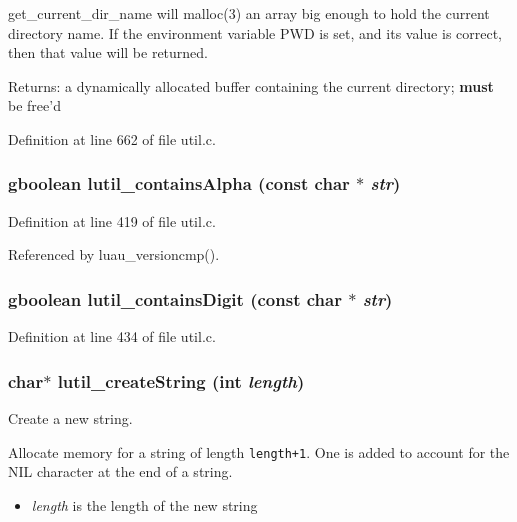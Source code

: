 get\_\-current\_\-dir\_\-name will malloc(3) an array big enough to hold the current directory name. If the environment variable PWD is set, and its value is correct, then that value will be returned.

\begin{Desc}
\item[Returns:]a dynamically allocated buffer containing the current directory; {\bf must} be free'd \end{Desc}


Definition at line 662 of file util.c.
\subsubsection{\setlength{\rightskip}{0pt plus 5cm}gboolean lutil\_\-contains\-Alpha (const char $\ast$ {\em str})}\label{util_8c_a13}




Definition at line 419 of file util.c.

Referenced by luau\_\-versioncmp().
\subsubsection{\setlength{\rightskip}{0pt plus 5cm}gboolean lutil\_\-contains\-Digit (const char $\ast$ {\em str})}\label{util_8c_a14}




Definition at line 434 of file util.c.
\subsubsection{\setlength{\rightskip}{0pt plus 5cm}char$\ast$ lutil\_\-create\-String (int {\em length})}\label{util_8c_a2}


Create a new string. 

Allocate memory for a string of length {\tt length+1}. One is added to account for the NIL character at the end of a string.

\begin{itemize}
\item {\em length\/} is the length of the new string 
\end{itemize}


